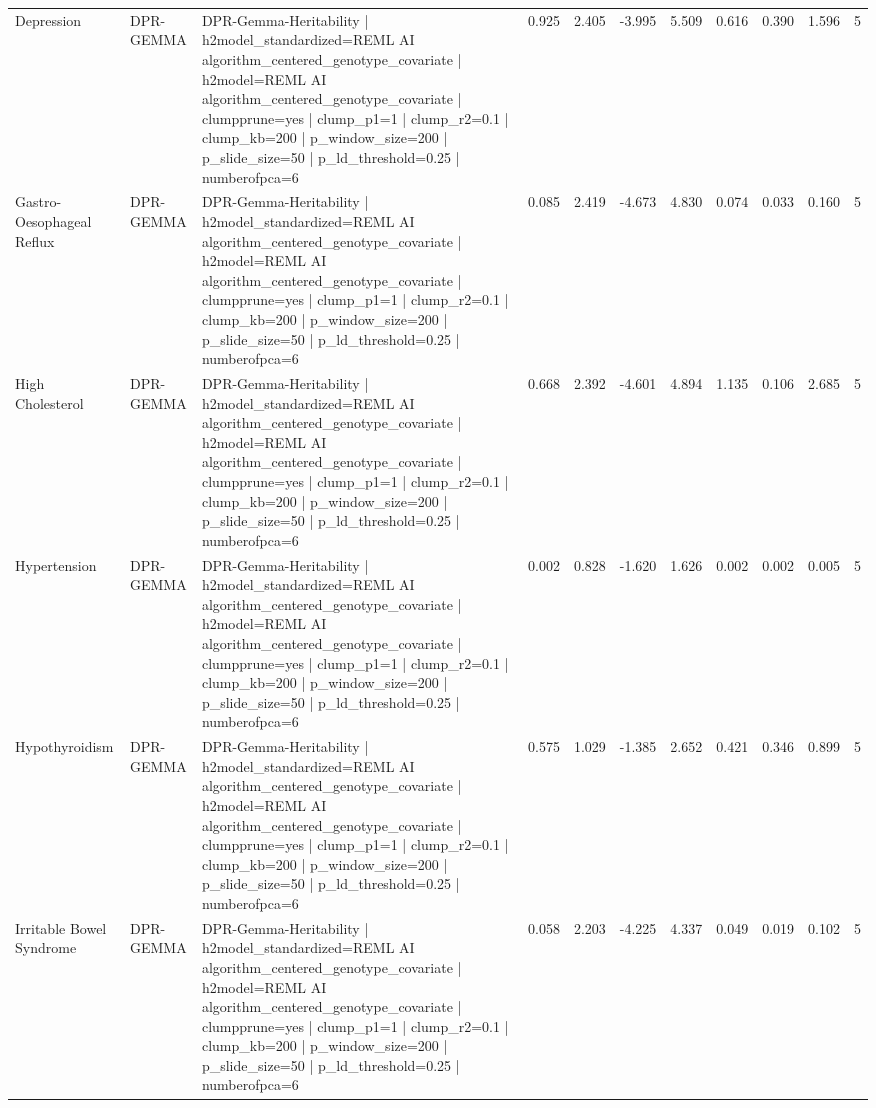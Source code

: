 \begin{landscape}
\begin{longtable}{p{2.4cm}p{1.8cm}p{6.0cm}rrrrrrrr}
Depression & DPR-GEMMA & DPR-Gemma-Heritability | h2model\_standardized=REML AI algorithm\_centered\_genotype\_covariate | h2model=REML AI algorithm\_centered\_genotype\_covariate | clumpprune=yes | clump\_p1=1 | clump\_r2=0.1 | clump\_kb=200 | p\_window\_size=200 | p\_slide\_size=50 | p\_ld\_threshold=0.25 | numberofpca=6 & 0.925 & 2.405 & -3.995 & 5.509 & 0.616 & 0.390 & 1.596 & 5 \\
Gastro-Oesophageal Reflux & DPR-GEMMA & DPR-Gemma-Heritability | h2model\_standardized=REML AI algorithm\_centered\_genotype\_covariate | h2model=REML AI algorithm\_centered\_genotype\_covariate | clumpprune=yes | clump\_p1=1 | clump\_r2=0.1 | clump\_kb=200 | p\_window\_size=200 | p\_slide\_size=50 | p\_ld\_threshold=0.25 | numberofpca=6 & 0.085 & 2.419 & -4.673 & 4.830 & 0.074 & 0.033 & 0.160 & 5 \\
High Cholesterol & DPR-GEMMA & DPR-Gemma-Heritability | h2model\_standardized=REML AI algorithm\_centered\_genotype\_covariate | h2model=REML AI algorithm\_centered\_genotype\_covariate | clumpprune=yes | clump\_p1=1 | clump\_r2=0.1 | clump\_kb=200 | p\_window\_size=200 | p\_slide\_size=50 | p\_ld\_threshold=0.25 | numberofpca=6 & 0.668 & 2.392 & -4.601 & 4.894 & 1.135 & 0.106 & 2.685 & 5 \\
Hypertension & DPR-GEMMA & DPR-Gemma-Heritability | h2model\_standardized=REML AI algorithm\_centered\_genotype\_covariate | h2model=REML AI algorithm\_centered\_genotype\_covariate | clumpprune=yes | clump\_p1=1 | clump\_r2=0.1 | clump\_kb=200 | p\_window\_size=200 | p\_slide\_size=50 | p\_ld\_threshold=0.25 | numberofpca=6 & 0.002 & 0.828 & -1.620 & 1.626 & 0.002 & 0.002 & 0.005 & 5 \\
Hypothyroidism & DPR-GEMMA & DPR-Gemma-Heritability | h2model\_standardized=REML AI algorithm\_centered\_genotype\_covariate | h2model=REML AI algorithm\_centered\_genotype\_covariate | clumpprune=yes | clump\_p1=1 | clump\_r2=0.1 | clump\_kb=200 | p\_window\_size=200 | p\_slide\_size=50 | p\_ld\_threshold=0.25 | numberofpca=6 & 0.575 & 1.029 & -1.385 & 2.652 & 0.421 & 0.346 & 0.899 & 5 \\
Irritable Bowel Syndrome & DPR-GEMMA & DPR-Gemma-Heritability | h2model\_standardized=REML AI algorithm\_centered\_genotype\_covariate | h2model=REML AI algorithm\_centered\_genotype\_covariate | clumpprune=yes | clump\_p1=1 | clump\_r2=0.1 | clump\_kb=200 | p\_window\_size=200 | p\_slide\_size=50 | p\_ld\_threshold=0.25 | numberofpca=6 & 0.058 & 2.203 & -4.225 & 4.337 & 0.049 & 0.019 & 0.102 & 5 \\

\end{longtable}
\end{landscape}
